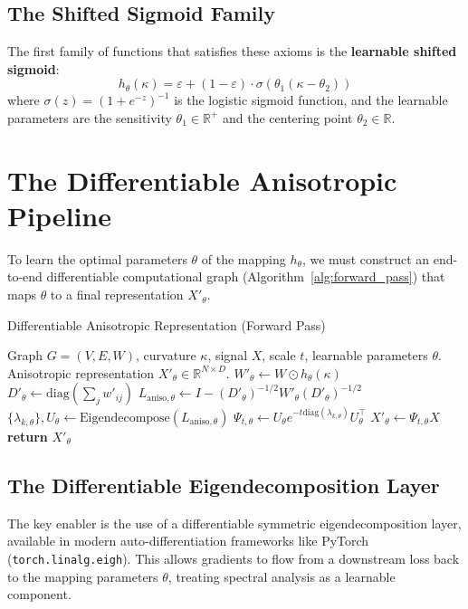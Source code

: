 \documentclass[11pt, letterpaper]{article}
\begin{document}
\subsection{The Shifted Sigmoid Family}
The first family of functions that satisfies these axioms is the \textbf{learnable shifted sigmoid}:
\begin{equation}
    h_\theta(\kappa) = \varepsilon + (1 - \varepsilon) \cdot \sigma(\theta_1(\kappa - \theta_2))
    \label{eq:sigmoid_family}
\end{equation}
where $\sigma(z) = (1 + e^{-z})^{-1}$ is the logistic sigmoid function, and the learnable parameters are the sensitivity $\theta_1 \in \mathbb{R}^+$ and the centering point $\theta_2 \in \mathbb{R}$.

\section{The Differentiable Anisotropic Pipeline}
To learn the optimal parameters $\theta$ of the mapping $h_\theta$, we must construct an end-to-end differentiable computational graph (Algorithm~\ref{alg:forward_pass}) that maps $\theta$ to a final representation $X'_{\theta}$.

\begin{algorithm}[h!]
\caption{Differentiable Anisotropic Representation (Forward Pass)}
\label{alg:forward_pass}
\begin{algorithmic}[1]
\Require Graph $G=(V, E, W)$, curvature $\kappa$, signal $X$, scale $t$, learnable parameters $\theta$.
\Ensure Anisotropic representation $X'_{\theta} \in \mathbb{R}^{N \times D}$.
\Statex
\State $W'_\theta \gets W \odot h_\theta(\kappa)$ 
\State $D'_\theta \gets \text{diag}(\sum_j w'_{ij})$
\State $L_{\text{aniso}, \theta} \gets I - (D'_\theta)^{-1/2} W'_\theta (D'_\theta)^{-1/2}$
\State $\{\lambda_{k, \theta}\}, U_\theta \gets \text{Eigendecompose}(L_{\text{aniso}, \theta})$ 
\State $\Psi_{t, \theta} \gets U_\theta e^{-t\text{diag}(\lambda_{k, \theta})} U_\theta^\top$ 
\State $X'_{\theta} \gets \Psi_{t, \theta} X$
\State \textbf{return} $X'_{\theta}$
\end{algorithmic}
\end{algorithm}

\subsection{The Differentiable Eigendecomposition Layer}
The key enabler is the use of a differentiable symmetric eigendecomposition layer, available in modern auto-differentiation frameworks like PyTorch (\texttt{torch.linalg.eigh}). This allows gradients to flow from a downstream loss back to the mapping parameters $\theta$, treating spectral analysis as a learnable component.
\end{document}
